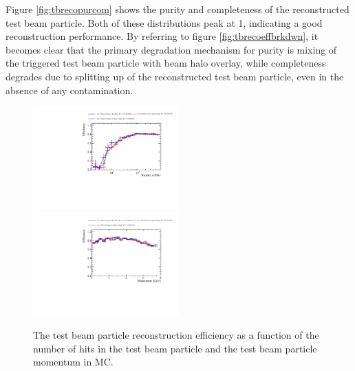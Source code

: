 Figure \ref{fig:tbrecopurcom} shows the purity and completeness of the reconstructed test beam particle.  Both of these distributions peak at 1, indicating a good reconstruction performance. By referring to figure \ref{fig:tbrecoeffbrkdwn}, it becomes clear that the primary degradation mechanism for purity is mixing of the triggered test beam particle with beam halo overlay, while completeness degrades due to splitting up of the reconstructed test beam particle, even in the absence of any contamination.  

\begin{figure}
\includegraphics[width=0.5\textwidth]{Figures/Metrics/MC/Beam/BeamParticleEfficiencyBreakdownVsNHits.pdf}
\includegraphics[width=0.5\textwidth]{Figures/Metrics/MC/Beam/BeamParticleEfficiencyBreakdownVsMomentum.pdf}
\caption{The test beam particle reconstruction efficiency as a function of the number of hits in the test beam particle and the test beam particle momentum in MC.}
\label{fig:tbrecoeff}
\end{figure}

